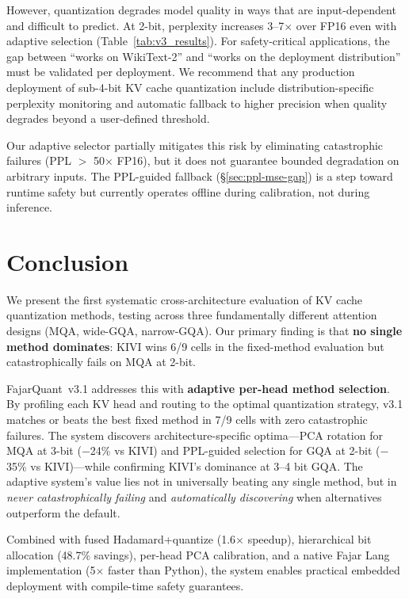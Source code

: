 \documentclass{article}
\begin{document}
However, quantization degrades model quality in ways that are
input-dependent and difficult to predict. At 2-bit, perplexity
increases 3--7$\times$ over FP16 even with adaptive selection
(Table~\ref{tab:v3_results}). For safety-critical applications, the
gap between ``works on WikiText-2'' and ``works on the deployment
distribution'' must be validated per deployment. We recommend that any
production deployment of sub-4-bit KV cache quantization include
distribution-specific perplexity monitoring and automatic fallback to
higher precision when quality degrades beyond a user-defined threshold.

Our adaptive selector partially mitigates this risk by eliminating
catastrophic failures (PPL $>$ 50$\times$ FP16), but it does not
guarantee bounded degradation on arbitrary inputs. The PPL-guided
fallback (\S\ref{sec:ppl-mse-gap}) is a step toward runtime safety
but currently operates offline during calibration, not during inference.

\section{Conclusion}

We present the first systematic cross-architecture evaluation of KV
cache quantization methods, testing across three fundamentally different
attention designs (MQA, wide-GQA, narrow-GQA). Our primary finding is
that \textbf{no single method dominates}: KIVI wins 6/9 cells in the
fixed-method evaluation but catastrophically fails on MQA at 2-bit.

FajarQuant~v3.1 addresses this with \textbf{adaptive per-head method
selection}. By profiling each KV head and routing to the optimal
quantization strategy, v3.1 matches or beats the best fixed method in
7/9 cells with zero catastrophic failures. The system discovers
architecture-specific optima---PCA rotation for MQA at 3-bit ($-$24\%
vs KIVI) and PPL-guided selection for GQA at 2-bit ($-$35\% vs
KIVI)---while confirming KIVI's dominance at 3--4 bit GQA. The
adaptive system's value lies not in universally beating any single
method, but in \emph{never catastrophically failing} and
\emph{automatically discovering} when alternatives outperform the
default.

Combined with fused Hadamard+quantize (1.6$\times$ speedup),
hierarchical bit allocation (48.7\% savings), per-head PCA calibration,
and a native Fajar Lang implementation (5$\times$ faster than Python),
the system enables practical embedded deployment with compile-time
safety guarantees.
\end{document}
